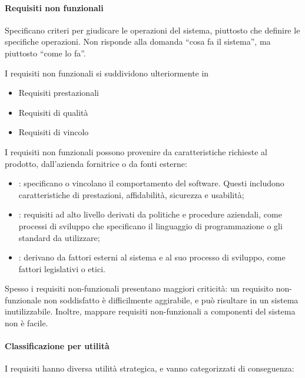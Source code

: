 \paragraph{Requisiti non funzionali}
\label{par:requisiti_non_funzionali}

Specificano criteri per giudicare le operazioni del sistema, piuttosto che
definire le specifiche operazioni. Non risponde alla domanda ``cosa fa il
sistema'', ma piuttosto ``come lo fa''.

I requisiti non funzionali si suddividono ulteriormente in

\begin{itemize}
  \item Requisiti prestazionali
  \item Requisiti di qualità
  \item Requisiti di vincolo
\end{itemize}

I requisiti non funzionali possono provenire da caratteristiche richieste al
prodotto, dall'azienda fornitrice o da fonti esterne:

\begin{itemize}
  \item {}: specificano o vincolano
    il comportamento del software. Questi includono caratteristiche di
    prestazioni, affidabilità, sicurezza e usabilità;
  \item {}: requisiti ad alto livello derivati da
    politiche e procedure aziendali, come processi di sviluppo che specificano
    il linguaggio di programmazione o gli standard da utilizzare;
  \item {}: derivano da fattori esterni al sistema e al
    suo processo di sviluppo, come fattori legislativi o etici.
\end{itemize}

Spesso i requisiti non-funzionali presentano maggiori criticità: un requisito
non-funzionale non soddisfatto è difficilmente aggirabile, e può risultare in
un sistema inutilizzabile. Inoltre, mappare requisiti non-funzionali a
componenti del sistema non è facile.

\paragraph{Classificazione per utilità}
\label{par:classificazione_per_utilita}

I requisiti hanno diversa utilità strategica, e vanno categorizzati di
conseguenza:

